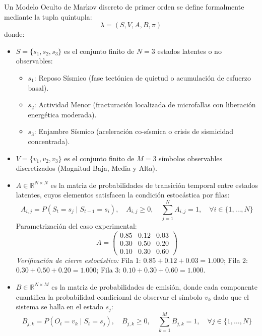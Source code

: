 \documentclass[11pt,a4paper]{article}
\begin{document}
Un Modelo Oculto de Markov discreto de primer orden se define formalmente mediante la tupla quintupla:
\begin{equation}
\lambda = (S, V, A, B, \pi)
\end{equation}
donde:
\begin{itemize}
    \item $S = \{s_1, s_2, s_3\}$ es el conjunto finito de $N = 3$ estados latentes o no observables:
    \begin{itemize}
        \item $s_1$: Reposo Sísmico (fase tectónica de quietud o acumulación de esfuerzo basal).
        \item $s_2$: Actividad Menor (fracturación localizada de microfallas con liberación energética moderada).
        \item $s_3$: Enjambre Sísmico (aceleración co-sísmica o crisis de sismicidad concentrada).
    \end{itemize}
    \item $V = \{v_1, v_2, v_3\}$ es el conjunto finito de $M = 3$ símbolos observables discretizados (Magnitud Baja, Media y Alta).
    \item $A \in \mathbb{R}^{N \times N}$ es la matriz de probabilidades de transición temporal entre estados latentes, cuyos elementos satisfacen la condición estocástica por filas:
    \begin{equation}
    A_{i,j} = P(S_t = s_j \mid S_{t-1} = s_i), \quad A_{i,j} \ge 0, \quad \sum_{j=1}^N A_{i,j} = 1, \quad \forall i \in \{1, \dots, N\}
    \end{equation}
    Parametrización del caso experimental:
    \begin{equation}
    A = \begin{pmatrix}
    0.85 & 0.12 & 0.03 \\
    0.30 & 0.50 & 0.20 \\
    0.10 & 0.30 & 0.60
    \end{pmatrix}
    \end{equation}
    \textit{Verificación de cierre estocástico:}
    Fila 1: $0.85 + 0.12 + 0.03 = 1.000$; 
    Fila 2: $0.30 + 0.50 + 0.20 = 1.000$; 
    Fila 3: $0.10 + 0.30 + 0.60 = 1.000$.
    \item $B \in \mathbb{R}^{N \times M}$ es la matriz de probabilidades de emisión, donde cada componente cuantifica la probabilidad condicional de observar el símbolo $v_k$ dado que el sistema se halla en el estado $s_j$:
    \begin{equation}
    B_{j,k} = P(O_t = v_k \mid S_t = s_j), \quad B_{j,k} \ge 0, \quad \sum_{k=1}^M B_{j,k} = 1, \quad \forall j \in \{1, \dots, N\}

\end{equation}
\end{itemize}
\end{document}
